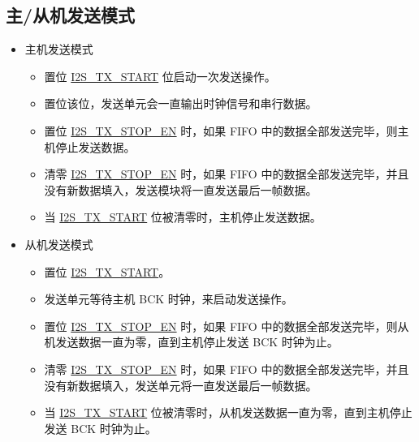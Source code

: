 \documentclass[main\_\_CN.tex]{subfiles}
\begin{document}
\subsection{主/从机发送模式} \label{subsubsection:master/slave_transmitting_mode}
\begin{itemize}
    \item 主机发送模式
    \begin{itemize}
        \item 置位 \hyperref[fielddesc:I2STXSTART]{I2S\_TX\_START} 位启动一次发送操作。
        \item 置位该位，发送单元会一直输出时钟信号和串行数据。
        \item 置位 \hyperref[fielddesc:I2STXSTOPEN]{I2S\_TX\_STOP\_EN} 时，如果 FIFO 中的数据全部发送完毕，则主机停止发送数据。
        \item 清零 \hyperref[fielddesc:I2STXSTOPEN]{I2S\_TX\_STOP\_EN} 时，如果 FIFO 中的数据全部发送完毕，并且没有新数据填入，发送模块将一直发送最后一帧数据。
        \item 当 \hyperref[fielddesc:I2STXSTART]{I2S\_TX\_START} 位被清零时，主机停止发送数据。
    \end{itemize}
    \item 从机发送模式
     \begin{itemize}
        \item 置位 \hyperref[fielddesc:I2STXSTART]{I2S\_TX\_START}。
        \item 发送单元等待主机 BCK 时钟，来启动发送操作。
        \item 置位 \hyperref[fielddesc:I2STXSTOPEN]{I2S\_TX\_STOP\_EN} 时，如果 FIFO 中的数据全部发送完毕，则从机发送数据一直为零，直到主机停止发送 BCK 时钟为止。
        \item 清零 \hyperref[fielddesc:I2STXSTOPEN]{I2S\_TX\_STOP\_EN} 时，如果 FIFO 中的数据全部发送完毕，并且没有新数据填入，发送单元将一直发送最后一帧数据。
        \item 当 \hyperref[fielddesc:I2STXSTART]{I2S\_TX\_START} 位被清零时，从机发送数据一直为零，直到主机停止发送 BCK 时钟为止。
    \end{itemize}
\end{itemize}
\end{document}
